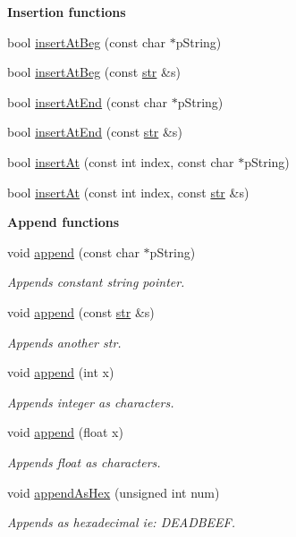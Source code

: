 \begin{Indent}{\bf Insertion functions}\par
\begin{DoxyCompactItemize}
\item 
bool \hyperlink{classstr_a8da84af112900c290abc20bb324e4240}{insert\+At\+Beg} (const char $\ast$p\+String)
\item 
bool \hyperlink{classstr_af7b64f0188256efb265adfc6896a7e25}{insert\+At\+Beg} (const \hyperlink{classstr}{str} \&s)
\item 
bool \hyperlink{classstr_a037d2e699471f477ea90cec667d9a5ca}{insert\+At\+End} (const char $\ast$p\+String)
\item 
bool \hyperlink{classstr_ab6bc89eb2001089fe145a12ae4aaa7a3}{insert\+At\+End} (const \hyperlink{classstr}{str} \&s)
\item 
bool \hyperlink{classstr_a9d52ab226d50edcf5fe99602ed93132c}{insert\+At} (const int index, const char $\ast$p\+String)
\item 
bool \hyperlink{classstr_a40ffe612b691f4ec8d8adbdc7242265b}{insert\+At} (const int index, const \hyperlink{classstr}{str} \&s)
\end{DoxyCompactItemize}
\end{Indent}
\begin{Indent}{\bf Append functions}\par
\begin{DoxyCompactItemize}
\item 
void \hyperlink{classstr_a6751896c500b0c6cc736fad69b30f3cb}{append} (const char $\ast$p\+String)
\begin{DoxyCompactList}\small\item\em Appends constant string pointer. \end{DoxyCompactList}\item 
void \hyperlink{classstr_afc29ccabbccbe846c714941a01d76d66}{append} (const \hyperlink{classstr}{str} \&s)
\begin{DoxyCompactList}\small\item\em Appends another str. \end{DoxyCompactList}\item 
void \hyperlink{classstr_afee6bd511f9cb4473dbe6c69cb8d4dd5}{append} (int x)
\begin{DoxyCompactList}\small\item\em Appends integer as characters. \end{DoxyCompactList}\item 
void \hyperlink{classstr_a2344a62090eae156a170d1198be4cfe2}{append} (float x)
\begin{DoxyCompactList}\small\item\em Appends float as characters. \end{DoxyCompactList}\item 
void \hyperlink{classstr_a7993ba8b23ebf88764a1d3ac1e69763f}{append\+As\+Hex} (unsigned int num)
\begin{DoxyCompactList}\small\item\em Appends as hexadecimal ie\+: D\+E\+A\+D\+B\+E\+EF. \end{DoxyCompactList}\end{DoxyCompactItemize}
\end{Indent}
